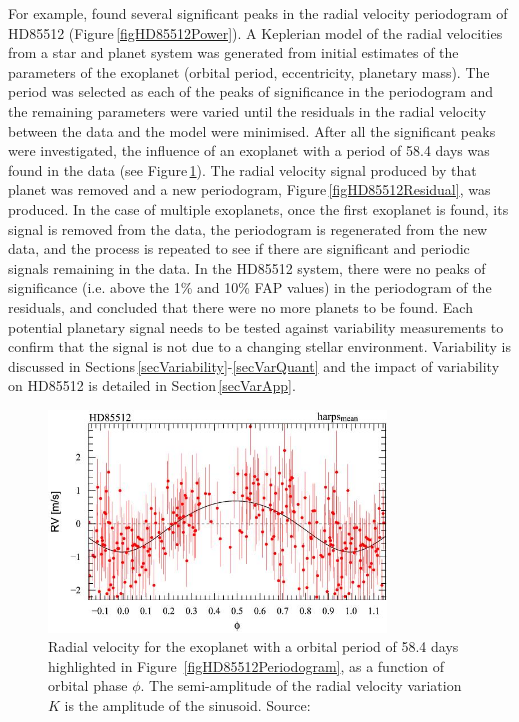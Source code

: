 For example, \citet{2011Pepe} found several significant peaks in the radial velocity periodogram of HD85512 (Figure\,\ref{figHD85512Power}). A Keplerian model of the radial velocities from a star and planet system was generated from initial estimates of the parameters of the exoplanet (orbital period, eccentricity, planetary mass). The period was selected as each of the peaks of significance in the periodogram and the remaining parameters were varied until the residuals in the radial velocity between the data and the model were minimised. After all the significant peaks were investigated, the influence of an exoplanet with a period of 58.4 days was found in the data (see Figure\,\ref{figHD85512Phased}). The radial velocity signal produced by that planet was removed and a new periodogram, Figure\,\ref{figHD85512Residual}, was produced. In the case of multiple exoplanets, once the first exoplanet is found, its signal is removed from the data, the periodogram is regenerated from the new data, and the process is repeated to see if there are significant and periodic signals remaining in the data. In the HD85512 system, there were no peaks of significance (i.e. above the 1\% and 10\% FAP values) in the periodogram of the residuals, and \citet{2011Pepe} concluded that there were no more planets to be found. Each potential planetary signal needs to be tested against variability measurements to confirm that the signal is not due to a changing stellar environment. Variability is discussed in Sections\,\ref{secVariability}-\ref{secVarQuant} and the impact of variability on HD85512 is detailed in Section\,\ref{secVarApp}.\\

\begin{figure}
    \centering
    \includegraphics[width=0.8\textwidth]{HD85512_Phased.jpg}
    \caption{Radial velocity for the exoplanet with a orbital period of 58.4 days highlighted in Figure~\ref{figHD85512Periodogram}, as a function of orbital phase $\phi$. The semi-amplitude of the radial velocity variation $K$ is the amplitude of the sinusoid. Source: \citet{2011Pepe}}
    \label{figHD85512Phased}
\end{figure}

